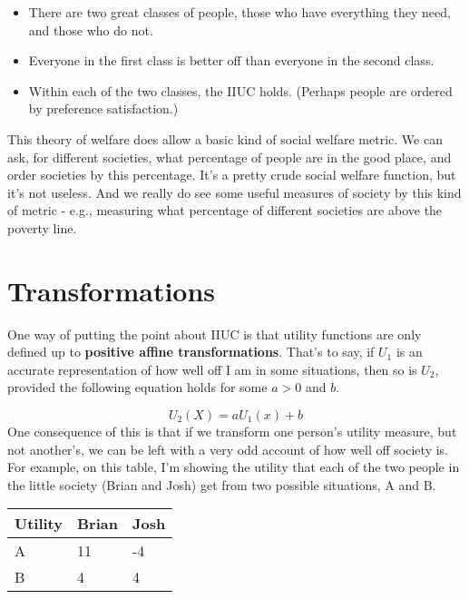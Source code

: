 \begin{itemize}
\item{} There are two great classes of people, those who have everything they need, and those who do not.

\item{} Everyone in the first class is better off than everyone in the second class.

\item{} Within each of the two classes, the IIUC holds. (Perhaps people are ordered by preference satisfaction.)

\end{itemize}
This theory of welfare does allow a basic kind of social welfare metric. We can ask, for different societies, what percentage of people are in the good place, and order societies by this percentage. It's a pretty crude social welfare function, but it's not useless. And we really do see some useful measures of society by this kind of metric - e.g., measuring what percentage of different societies are above the poverty line.

\newpage

\section{Transformations}
\label{transformations}

One way of putting the point about IIUC is that utility functions are only defined up to \textbf{positive affine transformations}. That's to say, if $U_1$ is an accurate representation of how well off I am in some situations, then so is $U_2$, provided the following equation holds for some $a > 0$ and $b$.

$$U_2(X) = aU_1(x) + b$$
One consequence of this is that if we transform one person's utility measure, but not another's, we can be left with a very odd account of how well off society is. For example, on this table, I'm showing the utility that each of the two people in the little society (Brian and Josh) get from two possible situations, A and B.

\begin{table}[htbp]
\begin{minipage}{\linewidth}
\setlength{\tymax}{0.5\linewidth}
\centering
\small
\begin{tabulary}{\textwidth}{@{}lll@{}} \toprule
 Utility & Brian & Josh \\
\midrule

 A & 11 & -4 \\
 B & 4 & 4 \\
\bottomrule

\end{tabulary}
\end{minipage}
\end{table}

